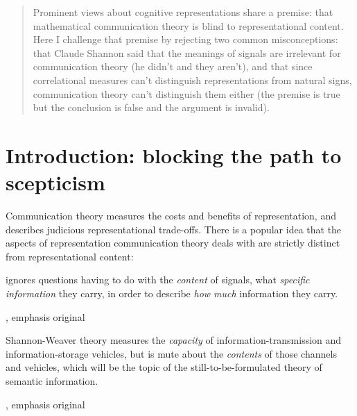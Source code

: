 \documentclass[12pt]{article}
\begin{document}
\maketitle


\begin{abstract}
\noindent Prominent views about cognitive representations share a premise: that mathematical communication theory is blind to representational content. Here I challenge that premise by rejecting two common misconceptions: that Claude Shannon said that the meanings of signals are irrelevant for communication theory (he didn't and they aren't), and that since correlational measures can't distinguish representations from natural signs, communication theory can't distinguish them either (the premise is true but the conclusion is false and the argument is invalid).
\end{abstract}

\section{Introduction: blocking the path to scepticism}\label{sec:intro}

Communication theory measures the costs and benefits of representation, and describes judicious representational trade-offs. 
There is a popular idea that the aspects of representation communication theory deals with are strictly distinct from representational content:

\begin{myquote}
 ignores questions having to do with the \emph{content} of signals, what \emph{specific information} they carry, in order to describe \emph{how much} information they carry.
\par\hspace*{\fill}\citet[41]{dretske1981knowledge}, emphasis original
\end{myquote}

\begin{myquote}
Shannon-Weaver theory measures the \emph{capacity} of information-transmission and information-storage vehicles, but is mute about the \emph{contents} of those channels and vehicles, which will be the topic of the still-to-be-formulated theory of semantic information.
\par\hspace*{\fill}\citet[344]{dennett1983intentional}, emphasis original
\end{myquote}
\end{document}
